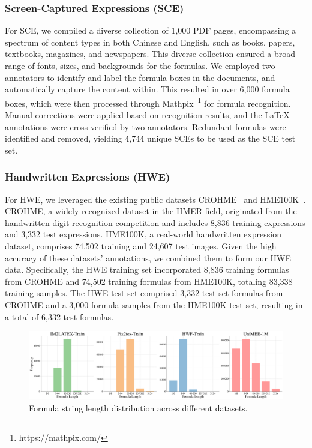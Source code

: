 \documentclass[runningheads]{llncs}
\begin{document}
\subsubsection{Screen-Captured Expressions (SCE)}

For SCE, we compiled a diverse collection of 1,000 PDF pages, encompassing a spectrum of content types in both Chinese and English, such as books, papers, textbooks, magazines, and newspapers. This diverse collection ensured a broad range of fonts, sizes, and backgrounds for the formulas. We employed two annotators to identify and label the formula boxes in the documents, and automatically capture the content within. This resulted in over 6,000 formula boxes, which were then processed through Mathpix~\footnote{https://mathpix.com/} for formula recognition. Manual corrections were applied based on recognition results, and the LaTeX annotations were cross-verified by two annotators. Redundant formulas were identified and removed, yielding 4,744 unique SCEs to be used as the SCE test set.


\subsubsection{Handwritten Expressions (HWE)}

For HWE, we leveraged the existing public datasets CROHME~\cite{mouchere2014icfhr,mouchere2016icfhr2016,mahdavi2019icdar} and HME100K~\cite{yuan2022syntax}. CROHME, a widely recognized dataset in the HMER field, originated from the handwritten digit recognition competition and includes 8,836 training expressions and 3,332 test expressions. HME100K, a real-world handwritten expression dataset, comprises 74,502 training and 24,607 test images. Given the high accuracy of these datasets' annotations, we combined them to form our HWE data. Specifically, the HWE training set incorporated 8,836 training formulas from CROHME and 74,502 training formulas from HME100K, totaling 83,338 training samples. The HWE test set comprised 3,332 test set formulas from CROHME and a 3,000 formula samples from the HME100K test set, resulting in a total of 6,332 test formulas.


\begin{figure}[tb]
  \centering
	\includegraphics[width=0.95 \linewidth]{figures/fig3_distribution.png}
    \caption{Formula string length distribution across different datasets.}
  \label{fig:fig4_distrib}
  \vspace{-3pt}
\end{figure}
\vspace{-10pt}
\end{document}
